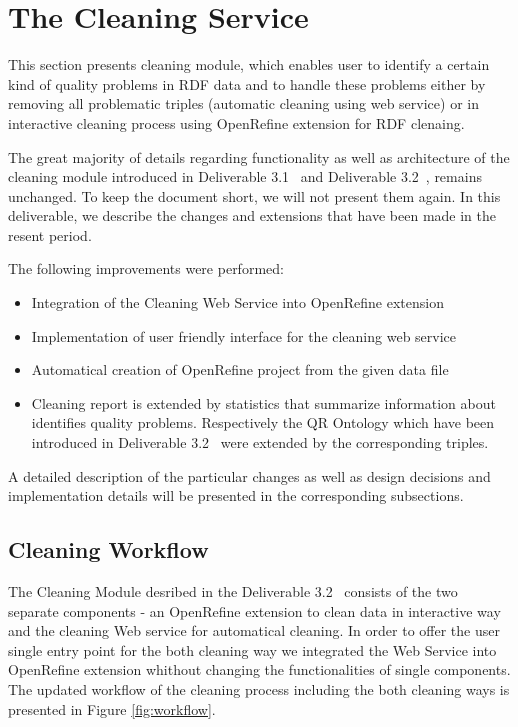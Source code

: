 \section{The Cleaning Service}
\label{sec:cleaning}

This section presents cleaning module, which enables user to identify a certain kind of quality problems in RDF data and to handle these problems either  by removing all problematic triples (automatic cleaning using web service) or in interactive cleaning process using OpenRefine extension for RDF clenaing. 

The great majority of details regarding functionality as well as architecture of the cleaning module introduced in Deliverable 3.1~\cite{d3.1} and Deliverable 3.2~\cite{d3.2}, remains unchanged.
To keep the document short, we will not present them again. 
In this deliverable, we describe the changes and extensions that have been made in the resent period. 

The following improvements were performed:
\begin{itemize}
\item Integration of the Cleaning Web Service into OpenRefine extension
\item Implementation of user friendly interface for the cleaning  web service
\item Automatical creation of OpenRefine project from the given data file
\item Cleaning report is extended by statistics that summarize information about identifies quality problems. Respectively the QR Ontology which have been introduced in Deliverable 3.2~\cite{d3.2} were extended by the corresponding triples. 
\end{itemize}
A detailed description of the particular changes as well as design decisions and implementation details will be presented in the corresponding subsections.


\subsection{Cleaning Workflow}
The Cleaning Module desribed in the Deliverable 3.2~\cite{d3.2} consists of the two separate components - an OpenRefine extension to clean data in interactive way and the cleaning Web service for automatical cleaning.
In order to offer the user single entry point for the both cleaning way  we integrated the Web Service into OpenRefine extension whithout changing the functionalities of single components.
The updated workflow of the cleaning process including the both cleaning ways is presented in Figure \ref{fig:workflow}.


